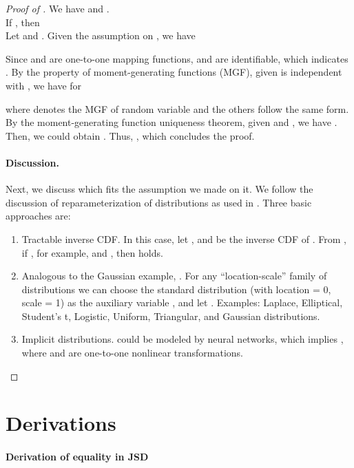 \documentclass{article} \usepackage{iclr2023_conference,times}
\theoremstyle{plain}
\theoremstyle{definition}
\theoremstyle{remark}
\begin{document}
\begin{proof}[Proof of ] We have  and . \\
 If , then  \\
 Let  and . Given the assumption on , we have


Since  and  are one-to-one mapping functions,  and  are identifiable, which indicates . By the property of moment-generating functions (MGF), given  is independent with , we have for 

where  denotes the MGF of random variable  and the others follow the same form. By the moment-generating function uniqueness theorem, 
given  and , we have . Then, we could obtain . Thus, , which concludes the proof.

\paragraph{Discussion.} Next, we discuss which  fits the assumption we made on it. We follow the discussion of reparameterization of distributions as used in \citet{Kingma2014AutoEncodingVB}. Three basic approaches are:
\begin{enumerate}
    \item Tractable inverse CDF. In this case, let , and  be the inverse CDF of . From , if , for example,  and , then  holds.
    \item Analogous to the Gaussian example, . For any ``location-scale'' family of distributions we can choose the standard distribution (with location = 0, scale = 1) as the auxiliary variable , and let . Examples: Laplace, Elliptical, Student’s t, Logistic, Uniform, Triangular, and Gaussian distributions.
    \item Implicit distributions.  could be modeled by neural networks, which implies , where  and  are one-to-one nonlinear transformations. 
\end{enumerate}
\end{proof}


\section{Derivations} \label{sec:appendix_derivation}

\paragraph{Derivation of equality in JSD}
\end{document}
